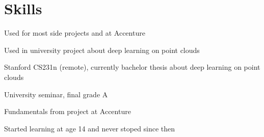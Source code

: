 \documentclass[]{florian_mueller_cv}
\begin{document}
\begin{minipage}[t]{0.29\textwidth}
\section{Skills}
Used for most side projects and at Accenture\newline

Used in university project about deep learning on point clouds\newline

Stanford CS231n (remote), currently bachelor thesis about deep learning on point clouds \newline

University seminar, final grade A\newline

Fundamentals from project at Accenture\newline

Started learning at age 14 and never stoped since then

%
%

\end{minipage} 
\hfill
\end{document}
